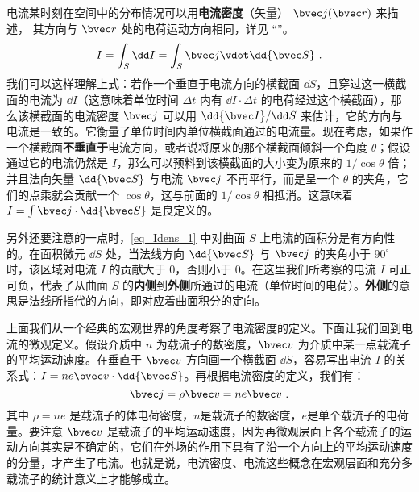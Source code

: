 

电流某时刻在空间中的分布情况可以用\textbf{电流密度}（矢量） $\bvec j(\bvec r)$ 来描述， 其方向与 $\bvec r$ 处的电荷运动方向相同，详见 “”。
\begin{equation}\label{eq_Idens_1}
I = \int_S \dd I= \int_S \bvec j \vdot \dd{\bvec S}~.
\end{equation}
我们可以这样理解上式：若作一个垂直于电流方向的横截面 $\dd S$，且穿过这一横截面的电流为 $\dd I$（这意味着单位时间 $\Delta t$ 内有 $\dd I\cdot \Delta t$ 的电荷经过这个横截面），那么该横截面的电流密度 $\bvec j$ 可以用 $\dd{\bvec I}/\dd S$ 来估计，它的方向与电流是一致的。它衡量了单位时间内单位横截面通过的电流量。现在考虑，如果作一个横截面\textbf{不垂直于}电流方向，或者说将原来的那个横截面倾斜一个角度 $\theta$；假设通过它的电流仍然是 $I$，那么可以预料到该横截面的大小变为原来的 $1/\cos\theta$ 倍；并且法向矢量 $\dd{\bvec S}$ 与电流 $\bvec j$ 不再平行，而是呈一个 $\theta$ 的夹角，它们的点乘就会贡献一个 $\cos\theta$，这与前面的 $1/\cos\theta$ 相抵消。这意味着 $I=\int \bvec j\cdot \dd{\bvec S}$ 是良定义的。

另外还要注意的一点时，\autoref{eq_Idens_1} 中对曲面 $S$ 上电流的面积分是有方向性的。在面积微元 $\dd S$ 处，当法线方向 $\dd{\bvec S}$ 与 $\bvec j$ 的夹角小于 $90^\circ$ 时，该区域对电流 $I$ 的贡献大于 $0$，否则小于 $0$。在这里我们所考察的电流 $I$ 可正可负，代表了从曲面 $S$ 的\textbf{内侧}到\textbf{外侧}所通过的电流（单位时间的电荷）。\textbf{外侧}的意思是法线所指代的方向，即对应着曲面积分的定向。

上面我们从一个经典的宏观世界的角度考察了电流密度的定义。下面让我们回到电流的微观定义。假设介质中 $n$ 为载流子的数密度，$\bvec v$ 为介质中某一点载流子的平均运动速度。在垂直于 $\bvec v$ 方向画一个横截面 $\dd S$，容易写出电流 $I$ 的关系式：$I=ne\bvec v \cdot \dd{\bvec S}$。再根据电流密度的定义，我们有：
\begin{equation}
\bvec j = \rho \bvec v = ne \bvec v~.
\end{equation}
其中 $\rho=ne$ 是载流子的体电荷密度，$n$是载流子的数密度，$e$是单个载流子的电荷量。要注意 $\bvec v$ 是载流子的平均运动速度，因为再微观层面上各个载流子的运动方向其实是不确定的，它们在外场的作用下具有了沿一个方向上的平均运动速度的分量，才产生了电流。也就是说，电流密度、电流这些概念在宏观层面和充分多载流子的统计意义上才能够成立\cite{GriffE}。
